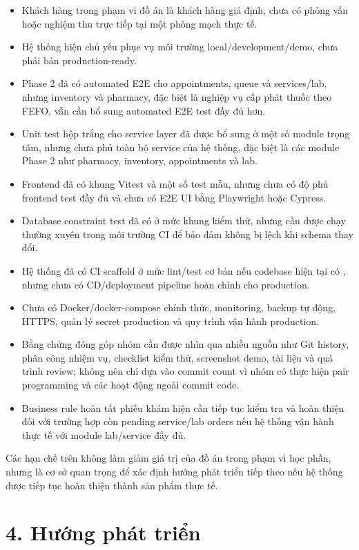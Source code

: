 \begin{itemize}
    \item Khách hàng trong phạm vi đồ án là khách hàng giả định, chưa có phỏng vấn hoặc nghiệm thu trực tiếp tại một phòng mạch thực tế.
    \item Hệ thống hiện chủ yếu phục vụ môi trường local/development/demo, chưa phải bản production-ready.
    \item Phase 2 đã có automated E2E cho appointments, queue và services/lab, nhưng inventory và pharmacy, đặc biệt là nghiệp vụ cấp phát thuốc theo FEFO, vẫn cần bổ sung automated E2E test đầy đủ hơn.
    \item Unit test hộp trắng cho service layer đã được bổ sung ở một số module trọng tâm, nhưng chưa phủ toàn bộ service của hệ thống, đặc biệt là các module Phase 2 như pharmacy, inventory, appointments và lab.
    \item Frontend đã có khung Vitest và một số test mẫu, nhưng chưa có độ phủ frontend test đầy đủ và chưa có E2E UI bằng Playwright hoặc Cypress.
    \item Database constraint test đã có ở mức khung kiểm thử, nhưng cần được chạy thường xuyên trong môi trường CI để bảo đảm không bị lệch khi schema thay đổi.
    \item Hệ thống đã có CI scaffold ở mức lint/test cơ bản nếu codebase hiện tại có , nhưng chưa có CD/deployment pipeline hoàn chỉnh cho production.
    \item Chưa có Docker/docker-compose chính thức, monitoring, backup tự động, HTTPS, quản lý secret production và quy trình vận hành production.
    \item Bằng chứng đóng góp nhóm cần được nhìn qua nhiều nguồn như Git history, phân công nhiệm vụ, checklist kiểm thử, screenshot demo, tài liệu và quá trình review; không nên chỉ dựa vào commit count vì nhóm có thực hiện pair programming và các hoạt động ngoài commit code.
    \item Business rule hoàn tất phiếu khám hiện cần tiếp tục kiểm tra và hoàn thiện đối với trường hợp còn pending service/lab orders nếu hệ thống vận hành thực tế với module lab/service đầy đủ.
\end{itemize}

Các hạn chế trên không làm giảm giá trị của đồ án trong phạm vi học phần, nhưng là cơ sở quan trọng để xác định hướng phát triển tiếp theo nếu hệ thống được tiếp tục hoàn thiện thành sản phẩm thực tế.

\section*{4. Hướng phát triển}

